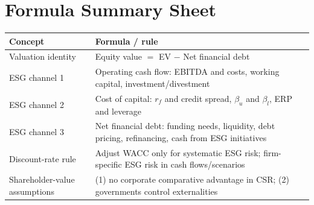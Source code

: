 \section{Formula Summary Sheet}
\begin{center}
\small
\renewcommand{\arraystretch}{1.5}
\begin{tabular}{@{}p{5cm}p{10cm}@{}}
\toprule
\textbf{Concept} & \textbf{Formula / rule}\\
\midrule
Valuation identity & Equity value $=$ EV $-$ Net financial debt\\
ESG channel 1 & Operating cash flow: EBITDA and costs, working capital, investment/divestment\\
ESG channel 2 & Cost of capital: $r_f$ and credit spread, $\beta_u$ and $\beta_l$, ERP and leverage\\
ESG channel 3 & Net financial debt: funding needs, liquidity, debt pricing, refinancing, cash from ESG initiatives\\
Discount-rate rule & Adjust WACC only for systematic ESG risk; firm-specific ESG risk in cash flows/scenarios\\
Shareholder-value assumptions & (1) no corporate comparative advantage in CSR; (2) governments control externalities\\
\bottomrule
\end{tabular}
\end{center}

